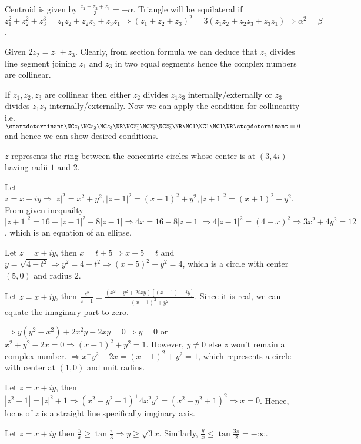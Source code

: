   Centroid is given by $\frac{z_1 + z_2 + z_3}{3} = -\alpha$. Triangle will be equilateral if $z_1^2 + z_2^2
  + z_3^3 = z_1z_2 + z_2z_3 + z_3z_1 \Rightarrow (z_1 + z_2 + z_3)^2 = 3(z_1z_2 + z_2z_3 + z_3z_1)
  \Rightarrow \alpha^2 = \beta$.
\item Given $2z_2 = z_1 + z_3$. Clearly, from section formula we can deduce that $z_2$ divides line segment
  joining $z_1$ and $z_3$ in two equal segments hence the complex numbers are collinear.
\item If $z_1, z_2, z_3$ are collinear then either $z_2$ divides $z_1z_3$ internally/externally or $z_3$
  divides $z_1z_2$ internally/externally. Now we can apply the condition for collinearity
  i.e. $\startdeterminant\NC z_1\NC z_2 \NC z_3\NR\NC \overline{z_1} \NC \overline{z_2} \NC
  \overline{z_3}\NR\NC 1\NC 1\NC 1\NR\stopdeterminant = 0$ and hence we can show desired conditions.
\item $z$ represents the ring between the concentric circles whose center is at $(3, 4i)$ having radii $1$
  and $2$.
\item Let $z = x + iy \Rightarrow |z|^2 = x^2 + y^2, |z - 1|^2 = (x - 1)^2 + y^2, |z + 1|^2 = (x + 1)^2 +
  y^2$. From given inequailty $|z + 1|^2 = 16 + |z - 1|^2 - 8|z - 1|\Rightarrow 4x = 16 - 8|z -
  1|\Rightarrow 4|z - 1|^2 = (4 - x)^2 \Rightarrow 3x^2 + 4y^2 = 12$, which is an equation of an ellipse.
\item Let $z = x + iy$, then $x = t + 5 \Rightarrow x - 5 = t$ and $y = \sqrt{4 - t^2}\Rightarrow y^2 = 4 -
  t^2 \Rightarrow (x - 5)^2 + y^2 = 4$, which is a circle with center $(5, 0)$ and radius $2$.
\item Let $z = x + iy$, then $\frac{z^2}{z - 1} = \frac{(x^2 - y^2 + 2ixy)[(x - 1) - iy]}{(x - 1)^2 +
  y^2}$. Since it is real, we can equate the imaginary part to zero.

  $\Rightarrow y(y^2 - x^2) + 2x^2y - 2xy = 0 \Rightarrow y = 0$ or $x^2 + y^2 - 2x = 0 \Rightarrow (x -
  1)^2 + y^2 = 1$. However, $y\neq 0$ else $z$ won't remain a complex number. $\Rightarrow x^ + y^2 - 2x =
  (x - 1)^2 + y^2 = 1$, which represents a circle with center at $(1, 0)$ and unit radius.
\item Let $z = x + iy$, then $|z^2 - 1| = |z|^2 + 1 \Rightarrow (x^2 - y^2 - 1)^ + 4x^2y^2 = (x^2 + y^2 +
  1)^2 \Rightarrow x = 0$. Hence, locus of $z$ is a straight line specifically imginary axis.
\item Let $z = x + iy$ then $\frac{y}{x} \geq \tan\frac{\pi}{3} \Rightarrow y\geq \sqrt{3}x$. Similarly,
  $\frac{y}{x} \leq \tan\frac{3\pi}{2}=-\infty$.

